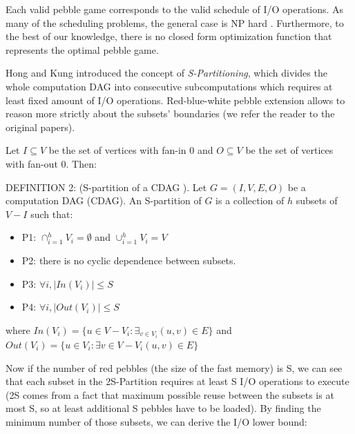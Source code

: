 \documentclass[sigconf]{acmart}
\begin{document}
	Each valid pebble game corresponds to the valid schedule of I/O operations. 
	As many of the scheduling problems, the general case is NP hard 
	\cite{RedBlueHard}. 
	Furthermore, to the best of our knowledge, there is no closed form 
	optimization function that represents the optimal pebble game.
	
	Hong and Kung introduced the concept of \textit{S-Partitioning}, which 
	divides the whole computation DAG into consecutive subcomputations which 
	requires at least fixed amount of I/O operations. Red-blue-white pebble 
	extension allows to reason more strictly about the subsets' boundaries 
	(we refer the reader to the original papers).
	
	Let $I \subseteq V$ be the set of vertices with fan-in 0 and $O \subseteq 
	V$ be the set 
	of vertices with fan-out 0. Then:
	
	DEFINITION 2:  (S-partition of a CDAG \cite{redbluewhite}).
	Let $G = (I,V,E,O)$ be a computation DAG (CDAG). An S-partition of $G$ 
	is a 
	collection of 
	$h$ subsets of $V - I$ such that:
	
	\begin{itemize}
		\item P1: $\cap_{i=1}^{h} V_i=\emptyset$ and $\cup_{i=1}^{h} V_i=V$
		\item P2: there is no cyclic dependence between subsets.
		\item P3: $\forall i, |In(V_i)| \le S$
		\item P4: $\forall i, |Out(V_i)| \le S$
	\end{itemize}
	where $In(V_i) = \{u \in V - V_i : \exists_{v \in V_i}(u,v) \in E \}$ and 
	$Out(V_i) = \{u \in V_i: \exists{v \in V - V_i} (u,v) \in E \}$
	
	Now if the number of red pebbles (the size of the fast memory) is S, we can 
	see that each subset in the 2S-Partition requires at 
	least S I/O operations to execute (2S comes from a fact that maximum 
	possible reuse between the subsets is at most S, so at least additional S 
	pebbles have to be loaded). By finding the minimum number of 
	those subsets, we can derive the I/O lower bound:
	
\end{document}
